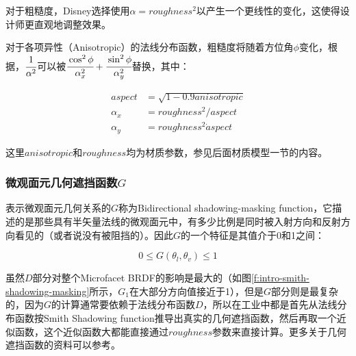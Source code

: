 对于粗糙度，Disney选择使用$\alpha=roughness^2$以产生一个更线性的变化，这使得设计师更直观地调整效果。

对于各项异性（Anisotropic）的法线分布函数，粗糙度将随着方位角$\phi$变化，根据\cite{a:PhysicallyBasedShadingatDisney}，$ \cfrac{1}{\alpha^2}$可以被$ \cfrac{\cos^2\phi}{\alpha^2_x}+ \cfrac{\sin^2\phi}{\alpha^2_y}$替换，其中：

\begin{equation}
\begin{aligned}
	aspect&=\sqrt{1-0.9 anisotropic}\\
	\alpha_x &=roughness^2/aspect\\
		\alpha_y &=roughness^2\dot aspect
\end{aligned}
\end{equation}

\noindent 这里$anisotropic$和$roughness$均为材质参数，参见后面材质模型一节的内容。




\subsubsection{微观面元几何遮挡函数$G$}
表示微观面元几何关系的$G$称为Bidirectional shadowing-masking function，它描述的是那些具有半矢量法线的微观面元中，有多少比例是同时被入射方向和反射方向看见的（或者说没有被阻挡的）。因此$G$的一个特征是其值介于0和1之间：

\begin{equation}
	0\leq G(\theta_l,\theta_v)\leq 1
\end{equation}

\noindent 虽然$D$部分对整个Microfacet BRDF的影响是最大的（如图\ref{f:intro-smith-shadowing-masking}所示，$G_1$在大部分方向值接近于1），但是$G$部分则是最复杂的，因为$G$的计算通常要依赖于法线分布函数$D$，所以在工业中都是首先从法线分布函数按Smith Shadowing function推导出真实的几何遮挡函数，然后再取一个近似函数，这个近似函数大都能直接通过$roughness$参数来直接计算。更多关于几何遮挡函数的资料可以参考\cite{a:UnderstandingtheMaskingShadowingFunctioninMicrofacetBasedBRDFs}。

